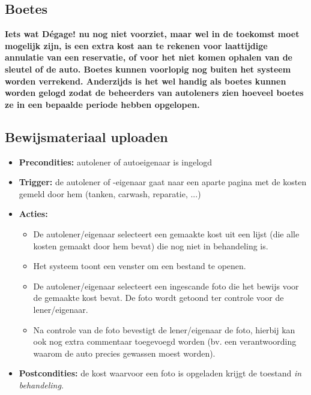 \documentclass[]{article}
\begin{document}
\subsection{Boetes}
\textbf{Iets wat Dégage! nu nog niet voorziet, maar wel in de toekomst moet mogelijk zijn, is een extra kost aan te rekenen voor laattijdige annulatie van een reservatie, of voor het niet komen ophalen van de sleutel of de auto. Boetes kunnen voorlopig nog buiten het systeem worden verrekend. Anderzijds is het wel handig als
boetes kunnen worden gelogd zodat de beheerders van autoleners zien hoeveel boetes ze in een bepaalde periode hebben opgelopen.}

\subsection{Bewijsmateriaal uploaden}
\begin{itemize}
\item \textbf{Precondities:} autolener of autoeigenaar is ingelogd
\item \textbf{Trigger:} de autolener of -eigenaar gaat naar een aparte pagina met de kosten gemeld door hem (tanken, carwash, reparatie, ...)
\item \textbf{Acties:} 
\begin{itemize}
	\item	De autolener/eigenaar selecteert een gemaakte kost uit een lijst (die alle kosten gemaakt door hem bevat) die nog niet in behandeling is.
	\item 	Het systeem toont een venster om een bestand te openen.
	\item   De autolener/eigenaar selecteert een ingescande foto die het bewijs voor de gemaakte kost bevat. De foto wordt getoond ter controle voor de lener/eigenaar.
	\item	Na controle van de foto bevestigt de lener/eigenaar de foto, hierbij kan ook nog extra commentaar toegevoegd worden (bv. een verantwoording waarom de auto precies gewassen moest worden).
\end{itemize}
\item \textbf{Postcondities:} de kost waarvoor een foto is opgeladen krijgt de toestand \emph{in behandeling}.
\end{itemize}
\end{document}
